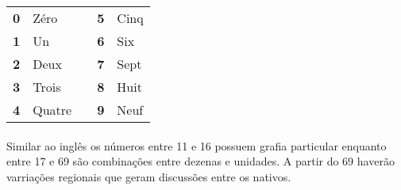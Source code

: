 \documentclass{article}
\begin{document}
            \begin{center}
                \begin{tabular}{r  l  c  r  l}
                    \textbf{0} & Zéro   &  & \textbf{5} & Cinq\\ 
                    \textbf{1} & Un     &  & \textbf{6} & Six\\
                    \textbf{2} & Deux   &  & \textbf{7} & Sept\\ 
                    \textbf{3} & Trois  &  & \textbf{8} & Huit\\ 
                    \textbf{4} & Quatre &  & \textbf{9} & Neuf\\ 
                \end{tabular}
            \end{center}
        
        \paragraph{}Similar ao inglês os números entre 11 e 16 possuem grafia particular enquanto entre 17 e 69 são combinações entre dezenas e unidades. A partir do 69 haverão varriações regionais que geram discussões entre os nativos.
           
\end{document}

